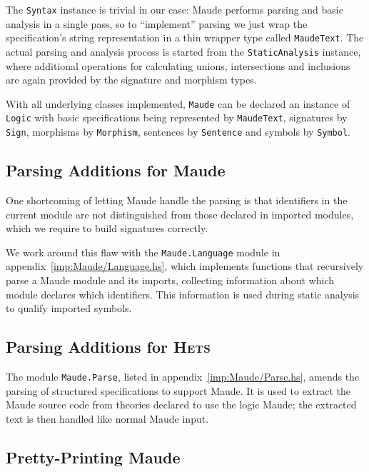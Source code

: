 \documentclass[11pt]{article}
\newcommand{\Hets}{\textsc{Hets}}
\begin{document}
The \texttt{Syntax} instance is trivial in our case: Maude performs parsing and basic analysis in a single pass, so to ``implement'' parsing we just wrap the specification's string representation in a thin wrapper type called \texttt{MaudeText}. The actual parsing and analysis process is started from the \texttt{StaticAnalysis} instance, where additional operations for calculating unions, intersections and inclusions are again provided by the signature and morphism types.

With all underlying classes implemented, \texttt{Maude} can be declared an instance of \texttt{Logic} with basic specifications being represented by \texttt{MaudeText}, signatures by \texttt{Sign}, morphisms by \texttt{Morphism}, sentences by \texttt{Sentence} and symbols by \texttt{Symbol}.


\subsection{Parsing Additions for Maude}
\label{sub:implementation_language}

One shortcoming of letting Maude handle the parsing is that identifiers in the current module are not distinguished from those declared in imported modules, which we require to build signatures correctly.

We work around this flaw with the \texttt{Maude.Language} module in appendix~\ref{imp:Maude/Language.hs}, which implements functions that recursively parse a Maude module and its imports, collecting information about which module declares which identifiers. This information is used during static analysis to qualify imported symbols.


\subsection{Parsing Additions for \Hets{}}
\label{sub:implementation_parse}

The module \texttt{Maude.Parse}, listed in appendix~\ref{imp:Maude/Parse.hs}, amends the parsing of structured specifications to support Maude. It is used to extract the Maude source code from theories declared to use the logic Maude; the extracted text is then handled like normal Maude input.


\subsection{Pretty-Printing Maude}
\end{document}
